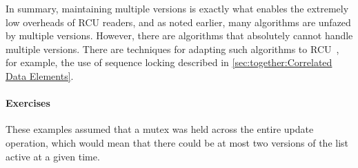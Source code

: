 In summary, maintaining multiple versions is exactly what enables the
extremely low overheads of RCU readers, and as noted earlier, many
algorithms are unfazed by multiple versions.
However, there are algorithms that absolutely cannot handle multiple versions.
There are techniques for adapting such algorithms to
RCU~\cite{PaulEdwardMcKenneyPhD}, for example, the use of sequence locking
described in \cref{sec:together:Correlated Data Elements}.

\paragraph{Exercises}
\label{sec:defer:Exercises}

These examples assumed that a mutex was held across the entire
update operation, which would mean that there could be at most two
versions of the list active at a given time.

